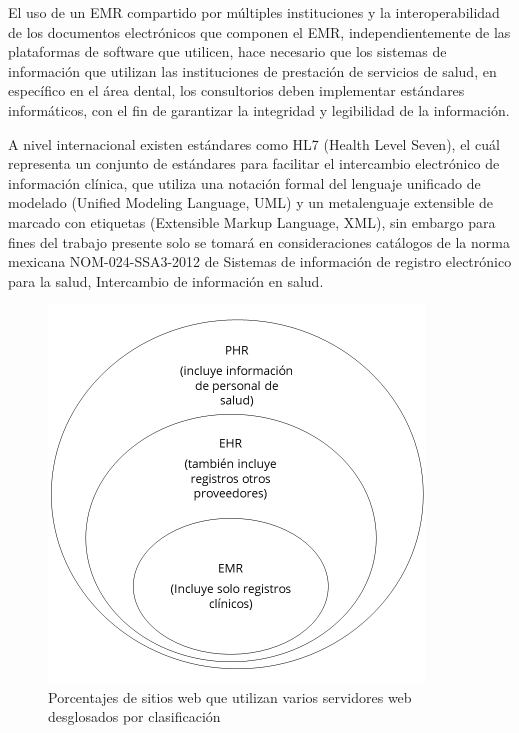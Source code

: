 \vspace{1em}

El uso de un EMR compartido por múltiples instituciones y la interoperabilidad de los documentos electrónicos que componen el EMR, independientemente de las plataformas de software que utilicen, hace necesario que los sistemas de información que utilizan las instituciones de prestación de servicios de salud, en específico en el área dental, los consultorios deben implementar estándares informáticos, con el fin de garantizar la integridad y legibilidad de la información.

\vspace{1em}

A nivel internacional existen estándares como HL7 (Health Level Seven), el cuál representa un conjunto de estándares para facilitar el intercambio electrónico de información clínica, que utiliza una notación formal del lenguaje unificado de modelado (Unified Modeling Language, UML) y un metalenguaje extensible de marcado con etiquetas (Extensible Markup Language, XML), sin embargo para fines del trabajo presente solo se tomará en consideraciones catálogos de la norma mexicana NOM-024-SSA3-2012 de Sistemas de información de registro electrónico para la salud, Intercambio de información en salud.


\begin{figure}[H]
\centering
\includegraphics[width=10cm, keepaspectratio]{pictures/picture01.png}
\caption{Porcentajes de sitios web que utilizan varios servidores web desglosados por clasificación}
\end{figure}




